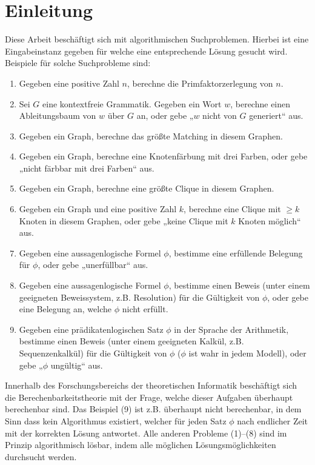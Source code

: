 \chapter{Einleitung}

Diese Arbeit beschäftigt sich mit algorithmischen Suchproblemen. 
Hierbei ist eine Eingabeinstanz gegeben für welche eine entsprechende Lösung gesucht wird.
Beispiele für solche Suchprobleme sind:
\begin{enumerate}[label=\arabic*.]
    \item Gegeben eine positive Zahl $n$, berechne die Primfaktorzerlegung von $n$.
    \item Sei $G$ eine kontextfreie Grammatik. Gegeben ein Wort $w$, berechne einen Ableitungsbaum von $w$ über $G$ an, oder gebe „$w$ nicht von $G$ generiert“ aus.
    \item Gegeben ein Graph, berechne das größte Matching in diesem Graphen.
    \item Gegeben ein Graph, berechne eine Knotenfärbung mit drei Farben, oder gebe „nicht färbbar mit drei Farben“ aus.
    \item Gegeben ein Graph, berechne eine größte Clique in diesem Graphen.
    \item Gegeben ein Graph und eine positive Zahl $k$, berechne eine Clique mit $\geq k$ Knoten in diesem Graphen, oder gebe „keine Clique mit $k$ Knoten möglich“ aus.
    \item Gegeben eine aussagenlogische Formel $\phi$, bestimme eine erfüllende Belegung für $\phi$, oder gebe „unerfüllbar“ aus.
    \item Gegeben eine aussagenlogische Formel $\phi$, bestimme einen Beweis (unter einem geeigneten Beweissystem, z.B. Resolution) für die Gültigkeit von $\phi$, oder gebe eine Belegung an, welche $\phi$ nicht erfüllt.
    \item Gegeben eine prädikatenlogischen Satz $\phi$ in der Sprache der Arithmetik, bestimme einen Beweis (unter einem geeigneten Kalkül, z.B. Sequenzenkalkül) für die Gültigkeit von $\phi$ ($\phi$ ist wahr in jedem Modell), oder gebe „$\phi$ ungültig“ aus.
\end{enumerate}
Innerhalb des Forschungsbereichs der theoretischen Informatik beschäftigt sich die Berechenbarkeitstheorie mit der Frage, welche dieser Aufgaben überhaupt berechenbar sind. Das Beispiel (9) ist z.B. überhaupt nicht berechenbar, in dem Sinn dass kein Algorithmus existiert, welcher für jeden Satz $\phi$ nach endlicher Zeit mit der korrekten Lösung antwortet.
Alle anderen Probleme (1)--(8) sind im Prinzip algorithmisch lösbar, indem alle möglichen Lösungsmöglichkeiten durchsucht werden.

